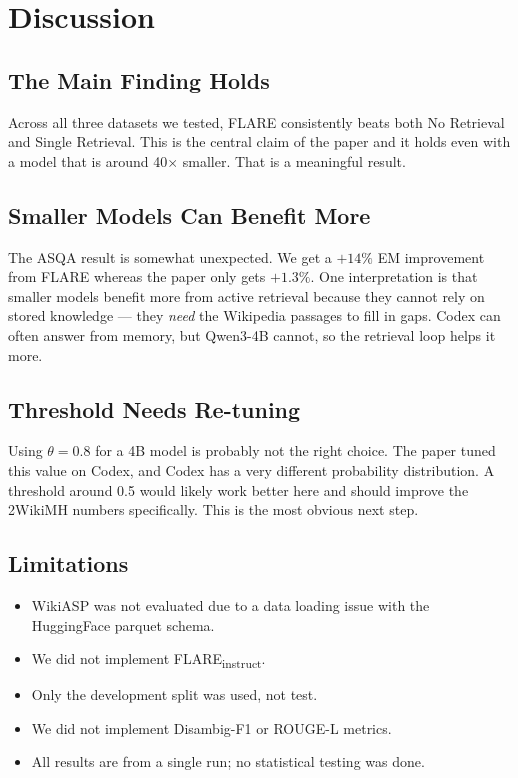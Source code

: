 \documentclass[conference]{IEEEtran}
\begin{document}
\section{Discussion}
\label{sec:discussion}

\subsection{The Main Finding Holds}
Across all three datasets we tested, FLARE consistently beats both
No Retrieval and Single Retrieval. This is the central claim of the
paper and it holds even with a model that is around 40$\times$ smaller.
That is a meaningful result.

\subsection{Smaller Models Can Benefit More}
The ASQA result is somewhat unexpected. We get a $+14\%$ EM improvement
from FLARE whereas the paper only gets $+1.3\%$. One interpretation
is that smaller models benefit more from active retrieval because they
cannot rely on stored knowledge — they \emph{need} the Wikipedia
passages to fill in gaps. Codex can often answer from memory, but
Qwen3-4B cannot, so the retrieval loop helps it more.

\subsection{Threshold Needs Re-tuning}
Using $\theta = 0.8$ for a 4B model is probably not the right choice.
The paper tuned this value on Codex, and Codex has a very different
probability distribution. A threshold around 0.5 would likely work
better here and should improve the 2WikiMH numbers specifically. This
is the most obvious next step.

\subsection{Limitations}
\begin{itemize}[leftmargin=*]
  \item WikiASP was not evaluated due to a data loading issue with
    the HuggingFace parquet schema.
  \item We did not implement FLARE\textsubscript{instruct}.
  \item Only the development split was used, not test.
  \item We did not implement Disambig-F1 or ROUGE-L metrics.
  \item All results are from a single run; no statistical testing
    was done.
\end{itemize}
\end{document}
